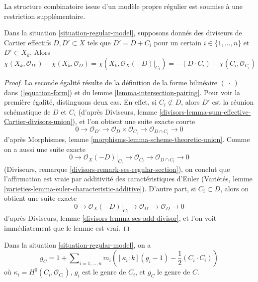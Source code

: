 \noindent
La structure combinatoire issue d'un modèle propre régulier
est soumise à une restriction supplémentaire.

\begin{lemma}
\label{lemma-add-component}
Dans la situation \ref{situation-regular-model}, supposons donnés des
diviseurs de Cartier effectifs $D, D' \subset X$ tels que
$D' = D + C_i$ pour un certain $i \in \{1, \ldots, n\}$ et $D' \subset X_k$.
Alors
$$
\chi(X_k, \mathcal{O}_{D'}) - \chi(X_k, \mathcal{O}_D) =
\chi(X_k, \mathcal{O}_X(-D)|_{C_i}) =
-(D \cdot C_i) + \chi(C_i, \mathcal{O}_{C_i})
$$
\end{lemma}

\begin{proof}
La seconde égalité résulte de la définition de la forme bilinéaire
$(\ \cdot\ )$ dans (\ref{equation-form}) et du
lemme \ref{lemma-intersection-pairing}. Pour voir la première
égalité, distinguons deux cas.
En effet, si $C_i \not \subset D$, alors $D'$ est la réunion
schématique de $D$ et $C_i$ (d'après
Diviseurs, lemme \ref{divisors-lemma-sum-effective-Cartier-divisors-union}),
et l'on obtient une suite exacte courte
$$
0 \to \mathcal{O}_{D'} \to
\mathcal{O}_D \times \mathcal{O}_{C_i} \to
\mathcal{O}_{D \cap C_i} \to 0
$$
d'après Morphismes, lemme \ref{morphisms-lemma-scheme-theoretic-union}.
Comme on a aussi une suite exacte
$$
0 \to \mathcal{O}_X(-D)|_{C_i} \to
\mathcal{O}_{C_i} \to \mathcal{O}_{D \cap C_i} \to 0
$$
(Diviseurs, remarque \ref{divisors-remark-ses-regular-section}),
on conclut que l'affirmation est vraie
par additivité des caractéristiques d'Euler
(Variétés, lemme \ref{varieties-lemma-euler-characteristic-additive}).
D'autre part, si $C_i \subset D$, alors on obtient une
suite exacte
$$
0 \to \mathcal{O}_X(-D)|_{C_i} \to \mathcal{O}_{D'} \to \mathcal{O}_D \to 0
$$
d'après Diviseurs, lemme \ref{divisors-lemma-ses-add-divisor},
et l'on voit immédiatement que le lemme est vrai.
\end{proof}

\begin{lemma}
\label{lemma-genus-formula}
Dans la situation \ref{situation-regular-model}, on a
$$
g_C = 1 + \sum\nolimits_{i = 1, \ldots, n}
m_i\left([\kappa_i : k] (g_i - 1) - \frac{1}{2}(C_i \cdot C_i)\right)
$$
où $\kappa_i = H^0(C_i, \mathcal{O}_{C_i})$,
$g_i$ est le genre de $C_i$, et $g_C$ le genre de $C$.
\end{lemma}

